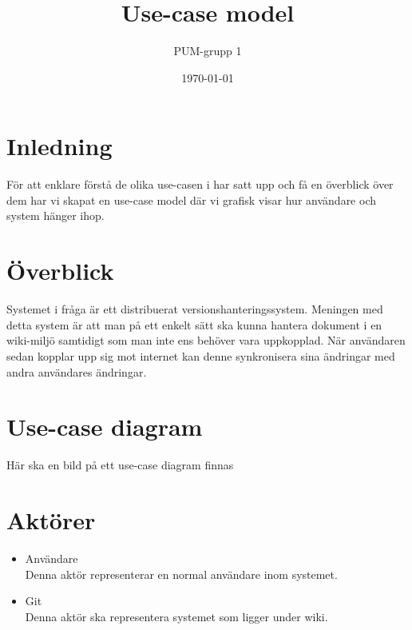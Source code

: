 

\ifpdf
\else
\fi

\title{Use-case model}
\author{PUM-grupp 1}
\date{\today}



\maketitle\thispagestyle{empty}

\newpage

\section{Inledning}
För att enklare förstå de olika use-casen i har satt upp och få en överblick över dem har vi skapat en use-case model där vi grafisk visar hur användare och system hänger ihop.
\section{Överblick}
Systemet i fråga är ett distribuerat versionshanteringssystem. Meningen med detta system är att man på ett enkelt sätt ska kunna hantera dokument i en wiki-miljö samtidigt som man inte ens behöver vara uppkopplad. När användaren sedan kopplar upp sig mot internet kan denne synkronisera sina ändringar med andra användares ändringar.
\section{Use-case diagram}
Här ska en bild på ett use-case diagram finnas
\section{Aktörer}
\begin{itemize}
	\item Användare
	\\Denna aktör representerar en normal användare inom systemet.
	\item Git
	\\Denna aktör ska representera systemet som ligger under wiki.
\end{itemize}
